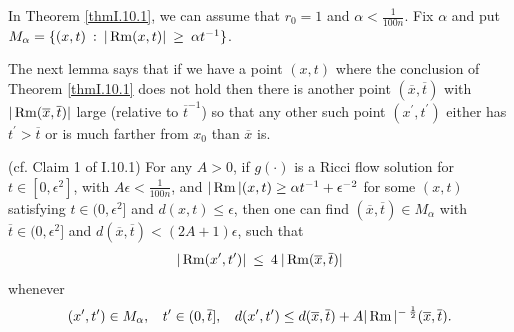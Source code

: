 In Theorem \ref{thmI.10.1},
we can assume that $r_0 = 1$ and $\alpha < \frac{1}{100n}$. Fix $\alpha$
and put $M_\alpha = \{(x,t) \: : \: |\operatorname{Rm}(x,t)| \: \ge \: \alpha t^{-1} \}$.

The next lemma says that if we have a point $(x,t)$ where the conclusion of
Theorem \ref{thmI.10.1} does not hold then there is another point
$(\overline{x}, \overline{t})$ with $|\operatorname{Rm}(\overline{x}, \overline{t})|$
large (relative to $\overline{t}^{-1}$) so that any other such point
$(x^\prime, t^\prime)$ either has
$t^\prime > \overline{t}$
or is much farther from $x_0$ than $\overline{x}$ is.

\begin{lemma}
  \label{lem:kl-point-selection-argument-point-selection-argument-lemma}
 (cf. Claim 1 of I.10.1) \label{Claim 1}
For any $A > 0$, if $g(\cdot)$ is a Ricci flow solution for
$t \in [0, \epsilon^2]$, with $A \epsilon < \frac{1}{100n}$, and
$|\operatorname{Rm}|(x,t) \ge \alpha t^{-1} + \epsilon^{-2}$
for some
$(x,t)$ satisfying
$t \in (0, \epsilon^2]$
and $d(x,t) \le \epsilon$, then
one can find $(\overline{x}, \overline{t}) \in M_\alpha$ with
$\overline{t} \in (0, \epsilon^2]$ and $d(\overline{x}, \overline{t}) <
(2A+1) \epsilon$, such that
\begin{equation} \label{I.(10.1)}
|\operatorname{Rm}(x^\prime,t^\prime)| \: \le \: 4 \: |\operatorname{Rm}(\overline{x}, \overline{t})|
\end{equation}
whenever
\begin{equation} \label{I.(10.2)}
(x^\prime, t^\prime) \in M_\alpha, \: \: \: \: t^\prime \in (0, \overline{t}],
 \: \: \: \: d(x^\prime, t^\prime) \le d(\overline{x}, \overline{t}) +
A |\operatorname{Rm}|^{- \: \frac12}(\overline{x}, \overline{t}).
\end{equation}
\end{lemma}
